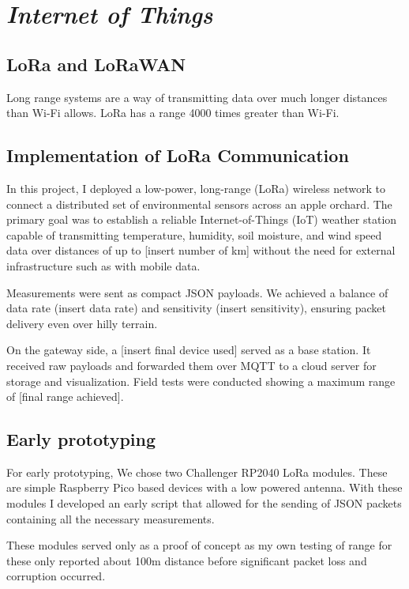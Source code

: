 \section{\emph{Internet of Things}}

\subsection{LoRa and LoRaWAN}

Long range systems are a way of transmitting data over much longer distances than
Wi-Fi allows. LoRa has a range 4000 times greater than Wi-Fi.

\subsection{Implementation of LoRa Communication}

In this project, I deployed a low-power, long-range (LoRa) wireless network to
connect a distributed set of environmental sensors across an apple orchard. The
primary goal was to establish a reliable Internet-of-Things (IoT) weather
station capable of transmitting temperature, humidity, soil moisture, and wind
speed data over distances of up to [insert number of km] without the need for 
external infrastructure such as with mobile data.

Measurements were sent as compact JSON payloads. We achieved a balance of data
rate (insert data rate) and sensitivity (insert sensitivity), ensuring packet delivery
even over hilly terrain. 

On the gateway side, a [insert final device used] served as a base station. It
received raw payloads and forwarded them over MQTT to a cloud server for storage
and visualization. Field tests were conducted showing a maximum range of 
[final range achieved].

\subsection{Early prototyping}

For early prototyping, We chose two Challenger RP2040 LoRa modules. These are
simple Raspberry Pico based devices with a low powered antenna. With these
modules I developed an early script that allowed for the sending of JSON packets
containing all the necessary measurements. 

These modules served only as a proof of concept as my own testing of range for
these only reported about 100m distance before significant packet loss and
corruption occurred.